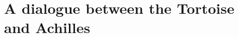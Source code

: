 









\section[The Tortoise and Achilles]{A dialogue between the Tortoise and Achilles}
\label{cha:zS:sec:question:illu:carroll}

